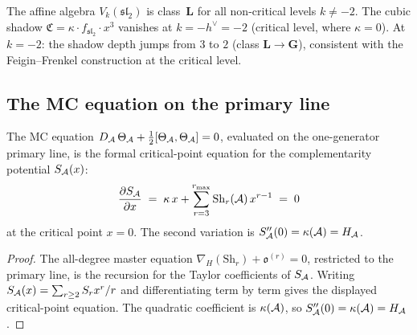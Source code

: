 \begin{example}
\label{ex:thqg-affine-class-jumps}
The affine algebra $V_k(\mathfrak{sl}_2)$ is class~$\mathbf{L}$
for all non-critical levels $k \neq -2$. The cubic shadow
$\mathfrak{C} = \kappa \cdot f_{\mathfrak{sl}_2}\cdot x^3$
vanishes at $k = -h^\vee = -2$ (critical level, where
$\kappa = 0$). At $k = -2$: the shadow depth jumps from
$3$ to $2$ (class $\mathbf{L} \to \mathbf{G}$), consistent
with the Feigin--Frenkel construction at the critical level.
\end{example}



\subsection{The MC equation on the primary line}
\label{subsec:thqg-mc-action}

\begin{theorem}
\label{thm:thqg-mc-euler-lagrange}
\ClaimStatusProvedHere
{}
The MC equation $D_{\mathcal{A}}\,\Theta_{\mathcal{A}} +
\frac{1}{2}[\Theta_{\mathcal{A}}, \Theta_{\mathcal{A}}] = 0$,
evaluated on the one-generator primary line, is the
formal critical-point equation for the complementarity potential
$S_{\mathcal{A}}(x)$:
\begin{equation}\label{eq:thqg-euler-lagrange}
\frac{\partial S_{\mathcal{A}}}{\partial x}
\;=\;
\kappa\,x + \sum_{r=3}^{r_{\max}}
\mathrm{Sh}_r(\mathcal{A})\,x^{r-1}
\;=\; 0
\end{equation}
at the critical point $x = 0$. The second variation is
$S''_{\mathcal{A}}(0) = \kappa(\mathcal{A}) = H_{\mathcal{A}}$.
\end{theorem}

\begin{proof}
The all-degree master equation
$\nabla_H(\mathrm{Sh}_r) + \mathfrak{o}^{(r)} = 0$,
restricted to the primary line, is the recursion for the
Taylor coefficients of $S_{\mathcal{A}}$. Writing
$S_{\mathcal{A}}(x) = \sum_{r \geq 2} S_r x^r/r$ and differentiating term
by term gives the displayed critical-point equation. The
quadratic coefficient is $\kappa(\mathcal{A})$, so
$S''_{\mathcal{A}}(0) = \kappa(\mathcal{A}) = H_{\mathcal{A}}$.
\end{proof}

